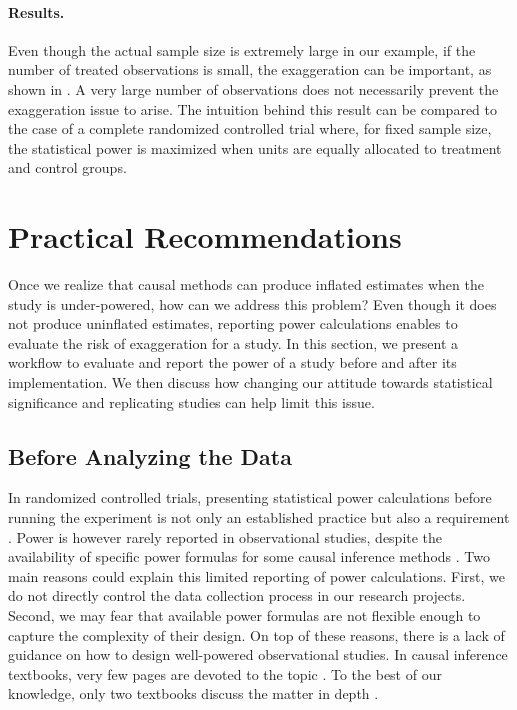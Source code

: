 \documentclass[12pt]{article}
\begin{document}
		\paragraph{Results.} Even though the actual sample size is extremely large in our example, if the number of treated observations is small, the exaggeration can be important, as shown in . A very large number of observations does not necessarily prevent the exaggeration issue to arise. The intuition behind this result can be compared to the case of a complete randomized controlled trial where, for fixed sample size, the statistical power is maximized when units are equally allocated to treatment and control groups.
		



\section{Practical Recommendations} \label{discussion}

    Once we realize that causal methods can produce inflated estimates when the study is under-powered, how can we address this problem? Even though it does not produce uninflated estimates, reporting power calculations enables to evaluate the risk of exaggeration for a study. In this section, we present a workflow to evaluate and report the power of a study before and after its implementation. We then discuss how changing our attitude towards statistical significance and replicating studies can help limit this issue.

\subsection{Before Analyzing the Data}

    In randomized controlled trials, presenting statistical power calculations before running the experiment is not only an established practice but also a requirement  \citep{duflo_using_2007, mcconnell_going_2015, athey_econometrics_2016}. Power is however rarely reported in observational studies, despite the availability of specific power formulas for some causal inference methods \citep{freeman_power_2013, cattaneo_power_2019}. Two main reasons could explain this limited reporting of power calculations. First, we do not directly control the data collection process in our research projects. Second, we may fear that available power formulas are not flexible enough to capture the complexity of their design. On top of these reasons, there is a lack of guidance on how to design well-powered observational studies. In causal inference textbooks, very few pages are devoted to the topic \citep{angrist_mostly_2009, angrist_mastering_2014, imbens_causal_2015, cunningham_causal_2021}. To the best of our knowledge, only two textbooks discuss the matter in depth \citep{shadish_experimental_2002, huntington-klein_effect_2021}.
    
\end{document}
